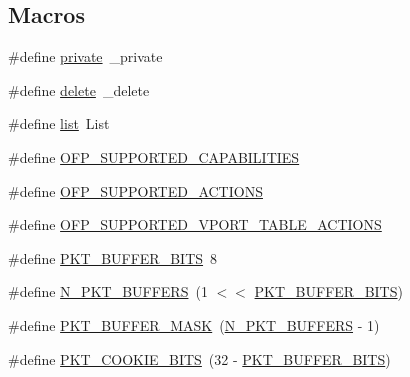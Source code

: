 \subsection*{Macros}
\begin{DoxyCompactItemize}
\item 
\#define \hyperlink{openflow-interface_8h_a6a1d6e1a12975a4e9a0b5b952e79eaad}{private}~\+\_\+private
\item 
\#define \hyperlink{openflow-interface_8h_a7dd106d12d0756ea0f88d56257a933ae}{delete}~\+\_\+delete
\item 
\#define \hyperlink{openflow-interface_8h_afd9bcfa176617760671b67580f536fa7}{list}~List
\item 
\#define \hyperlink{openflow-interface_8h_a0752d182ccd1a1b4c01c5dc0e2149f1d}{O\+F\+P\+\_\+\+S\+U\+P\+P\+O\+R\+T\+E\+D\+\_\+\+C\+A\+P\+A\+B\+I\+L\+I\+T\+I\+ES}
\item 
\#define \hyperlink{openflow-interface_8h_ac2ef921103b49a54683f80f9e86de30c}{O\+F\+P\+\_\+\+S\+U\+P\+P\+O\+R\+T\+E\+D\+\_\+\+A\+C\+T\+I\+O\+NS}
\item 
\#define \hyperlink{openflow-interface_8h_ab9bb642585ce807c268b3c8b492f12ba}{O\+F\+P\+\_\+\+S\+U\+P\+P\+O\+R\+T\+E\+D\+\_\+\+V\+P\+O\+R\+T\+\_\+\+T\+A\+B\+L\+E\+\_\+\+A\+C\+T\+I\+O\+NS}
\item 
\#define \hyperlink{openflow-interface_8h_aed8531856517a618c41da6948e8b9176}{P\+K\+T\+\_\+\+B\+U\+F\+F\+E\+R\+\_\+\+B\+I\+TS}~8
\item 
\#define \hyperlink{openflow-interface_8h_a7f4110b307713f2dc263ca5cd99c52e2}{N\+\_\+\+P\+K\+T\+\_\+\+B\+U\+F\+F\+E\+RS}~(1 $<$$<$ \hyperlink{openflow-interface_8h_aed8531856517a618c41da6948e8b9176}{P\+K\+T\+\_\+\+B\+U\+F\+F\+E\+R\+\_\+\+B\+I\+TS})
\item 
\#define \hyperlink{openflow-interface_8h_aa111ed922246d6e0a5d4de53d021a6a7}{P\+K\+T\+\_\+\+B\+U\+F\+F\+E\+R\+\_\+\+M\+A\+SK}~(\hyperlink{openflow-interface_8h_a7f4110b307713f2dc263ca5cd99c52e2}{N\+\_\+\+P\+K\+T\+\_\+\+B\+U\+F\+F\+E\+RS} -\/ 1)
\item 
\#define \hyperlink{openflow-interface_8h_a99a380d45f0b6885385e341b368f58db}{P\+K\+T\+\_\+\+C\+O\+O\+K\+I\+E\+\_\+\+B\+I\+TS}~(32 -\/ \hyperlink{openflow-interface_8h_aed8531856517a618c41da6948e8b9176}{P\+K\+T\+\_\+\+B\+U\+F\+F\+E\+R\+\_\+\+B\+I\+TS})
\end{DoxyCompactItemize}
